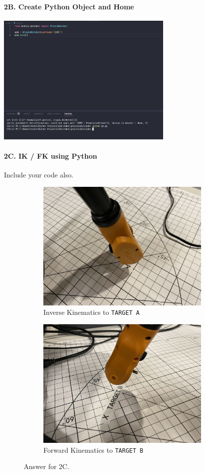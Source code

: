 \paragraph{2B. Create Python Object and Home}
\begin{center}
    \includegraphics[height=2.5in]{image/2b_exec_success.png}
\end{center}

\newpage
\paragraph{2C. IK / FK using Python}
Include your code also.

\begin{figure}[hb!]
     \centering
    \begin{subfigure}[b]{0.3\textwidth}
        \includegraphics[height=2.5in]{image/2c_a.jpg}
         \caption*{Inverse Kinematics to \texttt{TARGET A}}
     \end{subfigure}
     \hfill
     \begin{subfigure}[b]{0.3\textwidth}
        \includegraphics[height=2.5in]{image/2c_b.jpg}
         \caption*{Forward Kinematics to \texttt{TARGET B}}
     \end{subfigure}
    \caption*{Answer for 2C.}
\end{figure}

